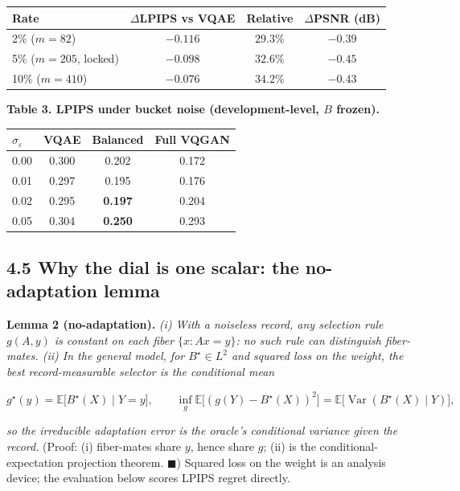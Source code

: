 \documentclass[11pt]{article}
\begin{document}
\begin{center}\begin{tabular}{lccc}
\toprule
Rate & $\Delta$LPIPS vs VQAE & Relative & $\Delta$PSNR (dB) \\
\midrule
2\% ($m=82$) & $-0.116$ & $29.3\%$ & $-0.39$ \\
5\% ($m=205$, locked) & $-0.098$ & $32.6\%$ & $-0.45$ \\
10\% ($m=410$) & $-0.076$ & $34.2\%$ & $-0.43$ \\
\bottomrule
\end{tabular}\end{center}

\textbf{Table 3. LPIPS under bucket noise (development-level, $B$ frozen).}

\begin{center}\begin{tabular}{lccc}
\toprule
$\sigma_\varepsilon$ & VQAE & Balanced & Full VQGAN \\
\midrule
0.00 & 0.300 & 0.202 & 0.172 \\
0.01 & 0.297 & 0.195 & 0.176 \\
0.02 & 0.295 & \textbf{0.197} & 0.204 \\
0.05 & 0.304 & \textbf{0.250} & 0.293 \\
\bottomrule
\end{tabular}\end{center}

\subsection*{4.5 Why the dial is one scalar: the no-adaptation lemma}

\textbf{Lemma 2 (no-adaptation).} \textit{(i) With a noiseless record, any selection rule $g(A, y)$ is constant on each fiber $\{x: Ax = y\}$: no such rule can distinguish fiber-mates. (ii) In the general model, for $B^\star \in L^2$ and squared loss on the weight, the best record-measurable selector is the conditional mean}

$$g^\star(y) = \mathbb{E}\big[B^\star(X) \mid Y = y\big], \qquad \inf_g \mathbb{E}\big[(g(Y) - B^\star(X))^2\big] = \mathbb{E}\big[\operatorname{Var}(B^\star(X) \mid Y)\big],$$

\textit{so the irreducible adaptation error is the oracle's conditional variance given the record.} (Proof: (i) fiber-mates share $y$, hence share $g$; (ii) is the conditional-expectation projection theorem. $\blacksquare$) Squared loss on the weight is an analysis device; the evaluation below scores LPIPS regret directly.
\end{document}
